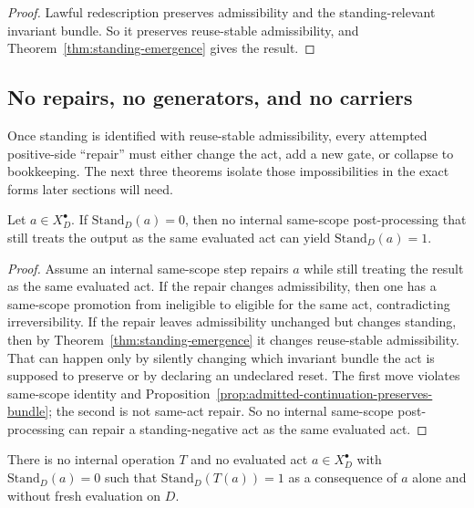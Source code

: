 \begin{proof}
Lawful redescription preserves admissibility and the standing-relevant invariant bundle. So it preserves reuse-stable admissibility, and Theorem~\ref{thm:standing-emergence} gives the result.\cite{MaleyNecessity}
\end{proof}

\subsection{No repairs, no generators, and no carriers}

Once standing is identified with reuse-stable admissibility, every attempted positive-side ``repair'' must either change the act, add a new gate, or collapse to bookkeeping. The next three theorems isolate those impossibilities in the exact forms later sections will need.

\begin{theorem}
\label{thm:no-same-act-repair}
Let $a\in X_D^{\bullet}$. If $\mathrm{Stand}_D(a)=0$, then no internal same-scope post-processing that still treats the output as the same evaluated act can yield $\mathrm{Stand}_D(a)=1$.
\end{theorem}

\begin{proof}
Assume an internal same-scope step repairs $a$ while still treating the result as the same evaluated act. If the repair changes admissibility, then one has a same-scope promotion from ineligible to eligible for the same act, contradicting irreversibility. If the repair leaves admissibility unchanged but changes standing, then by Theorem~\ref{thm:standing-emergence} it changes reuse-stable admissibility. That can happen only by silently changing which invariant bundle the act is supposed to preserve or by declaring an undeclared reset. The first move violates same-scope identity and Proposition~\ref{prop:admitted-continuation-preserves-bundle}; the second is not same-act repair. So no internal same-scope post-processing can repair a standing-negative act as the same evaluated act.\cite{MaleyNecessity,MaleyUnus}
\end{proof}

\begin{theorem}[No generators]
\label{thm:no-generators}
There is no internal operation $T$ and no evaluated act $a\in X_D^{\bullet}$ with $\mathrm{Stand}_D(a)=0$ such that $\mathrm{Stand}_D(T(a))=1$ as a consequence of $a$ alone and without fresh evaluation on $D$.
\end{theorem}

